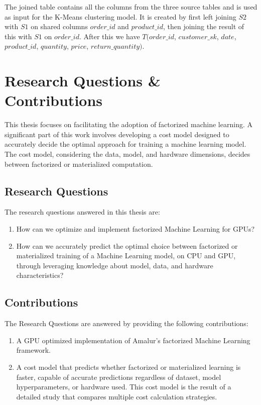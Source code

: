 The joined table contains all the columns from the three source tables and is used as input for the K-Means clustering model. It is created by first left joining $S2$ with $S1$ on shared columns $order\_id$ and $product\_id$, then joining the result of this with $S1$ on $order\_id$. After this we have $T(order\_id$, $customer\_sk$, $date$, $product\_id$, $quantity$, $price$, $return\_quantity)$.

\section{Research Questions \& Contributions}
This thesis focuses on facilitating the adoption of factorized machine learning. A significant part of this work involves developing a cost model designed to accurately decide the optimal approach for training a machine learning model. The cost model, considering the data, model, and hardware dimensions, decides between factorized or materialized computation.

\subsection{Research Questions}
The research questions answered in this thesis are:
\begin{enumerate}[leftmargin=1.5cm, label=\emph{RQ.\arabic*}]
  \item How can we optimize and implement factorized Machine Learning for GPUs?
  \item How can we accurately predict the optimal choice between factorized or materialized training of a Machine Learning model, on CPU and GPU, through leveraging knowledge about model, data, and hardware characteristics?
\end{enumerate}

\subsection{Contributions}
The Research Questions are answered by providing the following contributions:
\begin{enumerate}[leftmargin=1.5cm, label=\emph{C.\arabic*}]
  \item A GPU optimized implementation of Amalur's factorized Machine Learning framework.
  \item A cost model that predicts whether factorized or materialized learning is faster, capable of accurate predictions regardless of dataset, model hyperparameters, or hardware used. This cost model is the result of a detailed study that compares multiple cost calculation strategies.
\end{enumerate}

